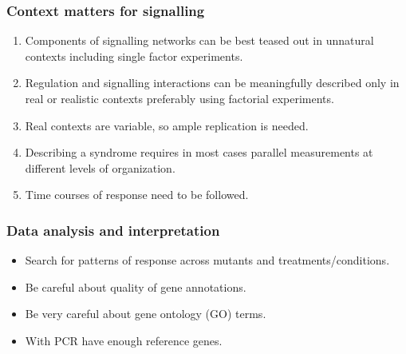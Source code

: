 \documentclass[11pt]{beamer}\usepackage[]{graphicx}\usepackage[]{xcolor}
\begin{document}
\begin{frame}
  \frametitle{Context matters for signalling}
  \begin{enumerate}
    \item Components of signalling networks can be best teased out in unnatural contexts including single factor experiments.
    \item Regulation and signalling interactions can be meaningfully described only in real or realistic contexts preferably using factorial experiments.
    \item Real contexts are variable, so ample replication is needed.
    \item Describing a syndrome requires in most cases parallel measurements at different levels of organization.
    \item Time courses of response need to be followed.
  \end{enumerate}
\end{frame}

\begin{frame}
  \frametitle{Data analysis and interpretation}
  \begin{itemize}
    \item Search for patterns of response across mutants and treatments/conditions.
    \item Be careful about quality of gene annotations.
    \item Be very careful about gene ontology (GO) terms.
    \item With PCR have enough reference genes.
  \end{itemize}
\end{frame}
\end{document}
